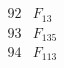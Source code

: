 \documentclass{article}
\begin{document}
{$$\begin{array}{|r|*{7}{r|}}
 & 
 & 
\\
\hline
92 
 & F_{13} &
 & 
 & 
 & 
 & 
 & 
\\
\hline
93 
 & F_{135} &
 & 
 & 
 & 
 & 
 & 
\\
\hline
94 
 & F_{113} &
 & 

\end{array}$$}
\end{document}
